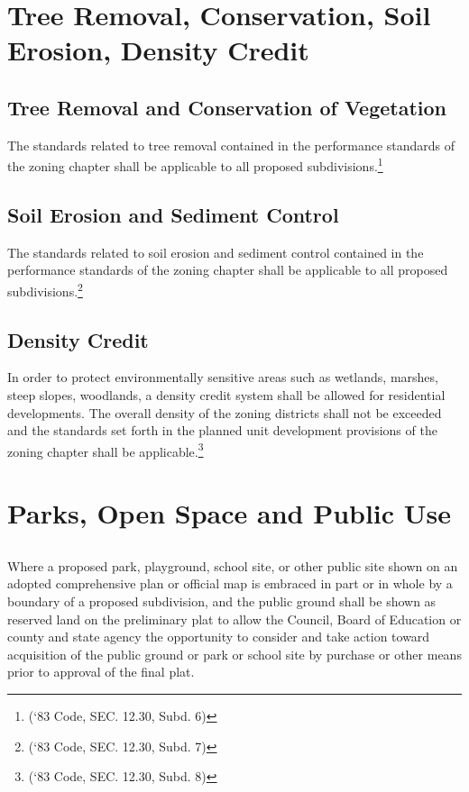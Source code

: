 \section{Tree Removal, Conservation, Soil Erosion, Density Credit}
\subsection{Tree Removal and Conservation of Vegetation}
The standards related to tree removal contained in the performance standards of the zoning chapter shall be applicable to all proposed subdivisions.\footnote{(‘83 Code, SEC. 12.30, Subd. 6)}
\subsection{Soil Erosion and Sediment Control}
The standards related to soil erosion and sediment control contained in the performance standards of the zoning chapter shall be applicable to all proposed subdivisions.\footnote{(‘83 Code, SEC. 12.30, Subd. 7)}
\subsection{Density Credit}
In order to protect environmentally sensitive areas such as wetlands, marshes, steep slopes, woodlands, a density credit system shall be allowed for residential developments.  The overall density of the zoning districts shall not be exceeded and the standards set forth in the planned unit development provisions of the zoning chapter shall be applicable.\footnote{(‘83 Code, SEC. 12.30, Subd. 8)}

\section{Parks, Open Space and Public Use}
\subsection{}
Where a proposed park, playground, school site, or other public site shown on an adopted comprehensive plan or official map is embraced in part or in whole by a boundary of a proposed subdivision, and the public ground shall be shown as reserved land on the preliminary plat to allow the Council, Board of Education or county and state agency the opportunity to consider and take action toward acquisition of the public ground or park or school site by purchase or other means prior to approval of the final plat.
